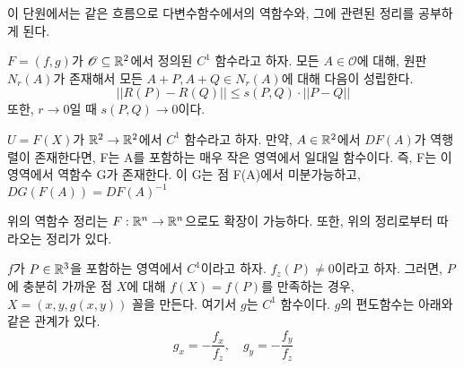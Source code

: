 이 단원에서는 같은 흐름으로 다변수함수에서의 역함수와, 그에 관련된 정리를 공부하게 된다.

\begin{lemma}
$F=(f,g)$가 $\mathcal{O} \subseteq \mathbb{R}^2$에서 정의된 $C^1$ 함수라고 하자. 모든 $A \in \mathcal{O}$에 대해, 원판 $N_r(A)$가 존재해서 모든 $A+P, A+Q \in N_r(A)$에 대해 다음이 성립한다.
$$
||R(P)-R(Q)|| \leq s(P,Q) \cdot ||P-Q||
$$
또한, $r \to 0$일 때 $s(P,Q) \to 0$이다.
\end{lemma}

\begin{theorem}
$U=F(X)$가 $\mathbb{R}^2 \to \mathbb{R}^2$에서 $C^1$ 함수라고 하자. 만약, $A \in \mathbb{R}^2$에서 $DF(A)$가 역행렬이 존재한다면, F는 A를 포함하는 매우 작은 영역에서 일대일 함수이다. 즉, F는 이 영역에서 역함수 G가 존재한다. 이 G는 점 F(A)에서 미분가능하고, $DG(F(A))=DF(A)^{-1}$
\end{theorem}

위의 역함수 정리는 $F: \mathbb{R}^n \to \mathbb{R}^n$으로도 확장이 가능하다. 또한, 위의 정리로부터 따라오는 정리가 있다.

\begin{theorem}
$f$가 $P \in \mathbb{R}^3$을 포함하는 영역에서 $C^1$이라고 하자. $f_z(P) \neq 0$이라고 하자. 그러면, $P$에 충분히 가까운 점 $X$에 대해 $f(X)=f(P)$를 만족하는 경우, $X=(x,y,g(x,y))$ 꼴을 만든다. 여기서 $g$는 $C^1$ 함수이다. $g$의 편도함수는 아래와 같은 관계가 있다.
$$
g_x = - \frac{f_x}{f_z},\quad g_y=-\frac{f_y}{f_z}
$$
\end{theorem}


